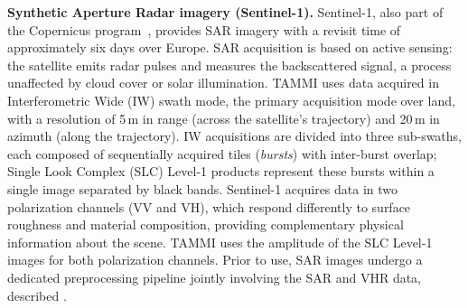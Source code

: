 \textbf{Synthetic Aperture Radar imagery (Sentinel-1).}
Sentinel-1, also part of the Copernicus
program~\cite{sentinel1}, provides SAR imagery with a
revisit time of approximately six days over Europe. SAR
acquisition is based on active sensing: the satellite emits
radar pulses and measures the backscattered signal, a process
unaffected by cloud cover or solar illumination. TAMMI uses
data acquired in Interferometric Wide (IW) swath mode, the
primary acquisition mode over land, with a resolution of
5\,m in range (across the satellite's trajectory) and 20\,m
in azimuth (along the trajectory). IW acquisitions are
divided into three sub-swaths, each composed of sequentially
acquired tiles (\textit{bursts}) with inter-burst overlap;
Single Look Complex (SLC) Level-1 products represent these
bursts within a single image separated by black bands.
Sentinel-1 acquires data in two polarization
channels (VV and VH), which respond differently to
surface roughness and material composition, providing
complementary physical information about the scene. TAMMI
uses the amplitude of the SLC Level-1 images for both
polarization channels. Prior to use, SAR images undergo a dedicated preprocessing
pipeline jointly involving the SAR and VHR data, described
\cite{tosatothesis}.
%
%
\label{sec:chap5_triplets}

